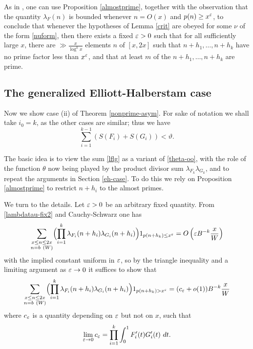 \begin{remark} As in \cite{pintz-szemeredi}, one can use Proposition \ref{almostprime}, together with the observation that the quantity $\lambda_F(n)$ is bounded whenever $n = O(x)$ and $p(n) \geq x^\varepsilon$, to conclude that whenever the hypotheses of Lemma \ref{crit} are obeyed for some $\nu$ of the form \eqref{nuform}, then there exists a fixed $\varepsilon>0$ such that for all sufficiently large $x$, there are $\gg \frac{x}{\log^k x}$ elements $n$ of $[x,2x]$ such that $n+h_1,\dots,n+h_k$ have no prime factor less than $x^\varepsilon$, and that at least $m$ of the $n+h_1,\dots,n+h_k$ are prime.
\end{remark}

\subsection{The generalized Elliott-Halberstam case}\label{geh-case}

Now we show case (ii) of Theorem \ref{nonprime-asym}.  For sake of notation we shall take $i_0=k$, as the other cases are similar; thus we have
\begin{equation}\label{ik1}
\sum_{i=1}^{k-1} (S(F_{i}) + S(G_{i})) < \vartheta.
\end{equation}

The basic idea is to view the sum \eqref{lflg} as a variant of \eqref{theta-oo}, with the role of the function $\theta$ now being played by the product divisor sum $\lambda_{F_k} \lambda_{G_k}$, and to repeat the arguments in Section \ref{eh-case}.  To do this we rely on Proposition \ref{almostprime} to restrict $n+h_i$ to the almost primes.

We turn to the details.  Let $\varepsilon > 0$ be an arbitrary fixed quantity.  From \eqref{lambdatau-fix2} and Cauchy-Schwarz one has
$$
 \sum_{\substack{x \leq n \leq 2x\\ n = b\ (W)}} \Bigl(\prod_{i=1}^k \lambda_{F_{i}}(n+h_{i}) \lambda_{G_{i}}(n+h_{i})\Bigr) 1_{p(n+h_k) \leq x^\varepsilon} = O\left( \varepsilon B^{-k} \frac{x}{W} \right)
$$
with the implied constant uniform in $\varepsilon$,
so by the triangle inequality and a limiting argument as $\varepsilon \to 0$ it suffices to show that
\begin{equation}\label{lltrunc}
 \sum_{\substack{x \leq n \leq 2x\\ n = b\ (W)}} \Bigl( \prod_{i=1}^k \lambda_{F_{i}}(n+h_{i}) \lambda_{G_{i}}(n+h_{i}) \Bigr)1_{p(n+h_k) > x^\varepsilon} = (c_\varepsilon + o(1)) B^{-k} \frac{x}{W} 
\end{equation}
where $c_\varepsilon$ is a quantity depending on $\varepsilon$ but not on $x$, such that
$$ \lim_{\varepsilon \to 0} c_\varepsilon = \prod_{i=1}^k \int_0^1 F'_i(t) G'_i(t)\ dt.$$

